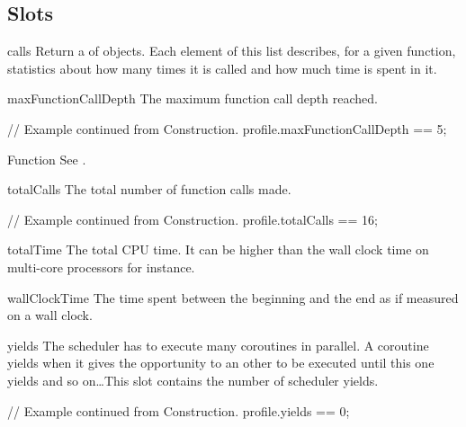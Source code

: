\subsection{Slots}

\begin{urbiscriptapi}

\item[calls]%
  Return a  of  objects. Each
  element of this list describes, for a given function, statistics about how
  many times it is called and how much time is spent in it.

\item[maxFunctionCallDepth]%
  The maximum function call depth reached.
\begin{urbiassert}
// Example continued from Construction.
profile.maxFunctionCallDepth == 5;
\end{urbiassert}

\item[Function] See .

\item[totalCalls]%
  The total number of function calls made.
\begin{urbiassert}
// Example continued from Construction.
profile.totalCalls == 16;
\end{urbiassert}

\item[totalTime]%
  The total CPU time. It can be higher than the wall clock time on
  multi-core processors for instance.

\item[wallClockTime]%
  The time spent between the beginning and the end as if measured on a wall
  clock.

\item[yields]%
  The scheduler has to execute many coroutines in parallel. A coroutine
  yields when it gives the opportunity to an other to be executed until this
  one yields and so on\dots This slot contains the number of scheduler
  yields.
\begin{urbiassert}
// Example continued from Construction.
profile.yields == 0;
\end{urbiassert}
\end{urbiscriptapi}


